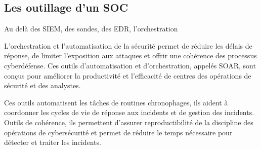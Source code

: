 \subsection{Les outillage d'un SOC}

Au delà des SIEM, des sondes, des EDR, l'orchestration

L'orchestration et l'automatisation de la sécurité  permet de réduire les délais de réponse, de  limiter l'exposition aux attaques et offrir une cohérence des processus cyberdéfense. Ces  outils d’automatisation et d’orchestration,  appelés SOAR, sont conçus pour améliorer la productivité et l’efficacité de centres des opérations de sécurité et des analystes.

Ces outils automatisent les tâches de routines chronophages,  ils aident à coordonner les cycles de vie de réponse aux incidents et de gestion des incidents. Outils de  cohérence, ils permettent d'assurer reproductibilité de la discipline des opérations de cybersécurité et permet de réduire le temps nécessaire pour détecter et traiter les incidents.
